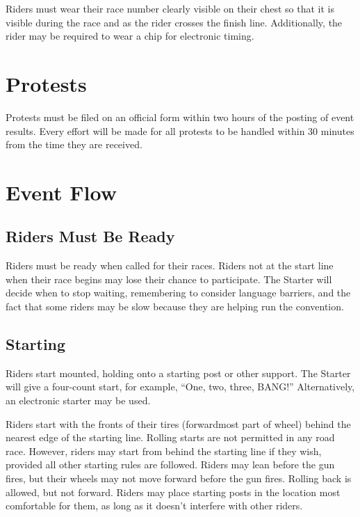 Riders must wear their race number clearly visible on their chest so that it is visible during the race and as the rider crosses the finish line.
Additionally, the rider may be required to wear a chip for electronic timing.

\section{Protests}

Protests must be filed on an official form within two hours of the posting of event results. Every effort will be made for all protests to be handled within 30 minutes from the time they are received.

\section{Event Flow} %

\subsection{Riders Must Be Ready}

Riders must be ready when called for their races.
Riders not at the start line when their race begins may lose their chance to participate.
The Starter will decide when to stop waiting, remembering to consider language barriers, and the fact that some riders may be slow because they are helping run the convention.

\subsection{Starting}

Riders start mounted, holding onto a starting post or other support.
The Starter will give a four-count start, for example, ``One, two, three, BANG!'' Alternatively, an electronic starter may be used.

Riders start with the fronts of their tires (forwardmost part of wheel) behind the nearest edge of the starting line.
Rolling starts are not permitted in any road race.
However, riders may start from behind the starting line if they wish, provided all other starting rules are followed.
Riders may lean before the gun fires, but their wheels may not move forward before the gun fires.
Rolling back is allowed, but not forward.
Riders may place starting posts in the location most comfortable for them, as long as it doesn't interfere with other riders.

